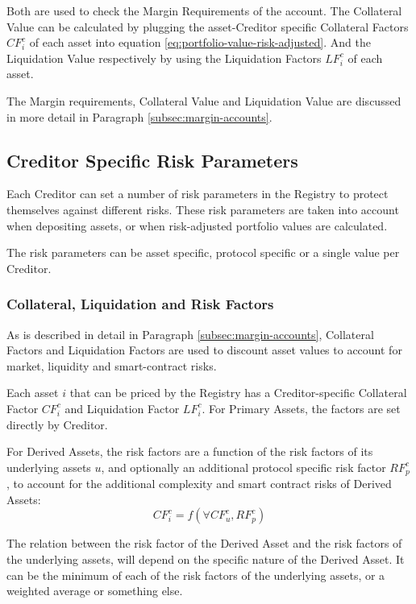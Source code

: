 \documentclass[sigconf,nonacm]{acmart}
\begin{document}
Both are used to check the Margin Requirements of the account.
The Collateral Value can be calculated by plugging the asset-Creditor specific Collateral Factors $CF_{i}^{c}$ of each asset into equation \ref{eq:portfolio-value-risk-adjusted}.
And the Liquidation Value respectively by using the Liquidation Factors $LF_{i}^{c}$ of each asset.

The Margin requirements, Collateral Value and Liquidation Value are discussed in more detail in Paragraph \ref{subsec:margin-accounts}.

\subsection{Creditor Specific Risk Parameters}
\label{subsec:creditor-specific-cisk-parameters}
Each Creditor can set a number of risk parameters in the Registry to protect themselves against different risks.
These risk parameters are taken into account when depositing assets, or when risk-adjusted portfolio values are calculated.

The risk parameters can be asset specific, protocol specific or a single value per Creditor.

\subsubsection{Collateral, Liquidation and Risk Factors}
As is described in detail in Paragraph \ref{subsec:margin-accounts}, Collateral Factors and Liquidation Factors are used to discount asset values to account for market, liquidity and smart-contract risks.

Each asset $i$ that can be priced by the Registry has a Creditor-specific Collateral Factor $CF_{i}^{c}$ and Liquidation Factor $LF_{i}^{c}$.
For Primary Assets, the factors are set directly by Creditor.

For Derived Assets, the risk factors are a function of the risk factors of its underlying assets $u$, and optionally an additional protocol specific risk factor $RF_{p}^{c}$,
to account for the additional complexity and smart contract risks of Derived Assets:
\begin{equation}
    CF_{i}^{c} = f(\forall CF_{u}^{c}, RF_{p}^{c})
\end{equation}

The relation between the risk factor of the Derived Asset and the risk factors of the underlying assets,
will depend on the specific nature of the Derived Asset.
It can be the minimum of each of the risk factors of the underlying assets, or a weighted average or something else.
\end{document}
